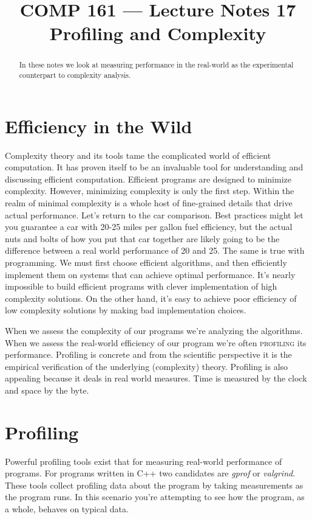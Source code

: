 \documentclass[]{tufte-handout}
\title{COMP 161 --- Lecture Notes 17 \\ Profiling and Complexity}
\date{}
\begin{document}
\maketitle

\begin{abstract}
In these notes we look at measuring performance in the real-world as the experimental counterpart to complexity analysis.
\end{abstract}


\section{Efficiency in the Wild}

Complexity theory and its tools tame the complicated world of efficient computation. It has proven itself to be an invaluable tool for understanding and discussing efficient computation. Efficient programs are designed to minimize complexity.  However, minimizing complexity is only the first step.  Within the realm of minimal complexity is a whole host of fine-grained details that drive actual performance. Let's return to the car comparison. Best practices might let you guarantee a car with 20-25 miles per gallon fuel efficiency, but the actual nuts and bolts of how you put that car together are likely going to be the difference between a real world performance of 20 and 25. The same is true with programming. We must first choose efficient algorithms, and then efficiently implement them on systems that can achieve optimal performance. It's nearly impossible to build efficient programs with clever implementation of high complexity solutions. On the other hand, it's easy to achieve poor efficiency of low complexity solutions by making bad implementation choices.

When we assess the complexity of our programs we're analyzing the algorithms. When we assess the real-world efficiency of our program we're often \textsc{profiling} its performance. Profiling is concrete and from the scientific perspective it is the empirical verification of the underlying (complexity) theory. Profiling is also appealing because it deals in real world measures. Time is measured by the clock and space by the byte.

\section{Profiling}

Powerful profiling tools exist that for measuring real-world performance of programs. For programs written in C++ two candidates are \textit{gprof} or \textit{valgrind}. These tools collect profiling data about the program by taking measurements as the program runs.  In this scenario you're attempting to see how the program, as a whole, behaves on typical data.
\end{document}
